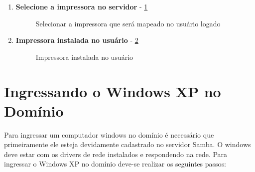 \begin{enumerate}
	\item \textbf{Selecione a impressora no servidor} - \ref{selecionar_impressora_servidor}
	\begin{figure}[ht]
	   	\centering
	   	\caption{Selecionar a impressora que será mapeado no usuário logado}
	    \label{selecionar_impressora_servidor}
	\end{figure}
	
	\item \textbf{Impressora instalada no usuário} - \ref{impressora_compartilhada}
	\begin{figure}[ht]
	   	\centering
	   	\caption{Impressora instalada no usuário}
	    \label{impressora_compartilhada}
	\end{figure}
	
\end{enumerate}

\section{Ingressando o Windows XP no Domínio}

Para ingressar um computador windows no domínio é necessário que primeiramente ele esteja devidamente cadastrado no servidor Samba. O windows deve estar com os drivers de rede instalados e respondendo na rede.
Para ingressar o Windows XP no domínio deve-se realizar os seguintes passos:

